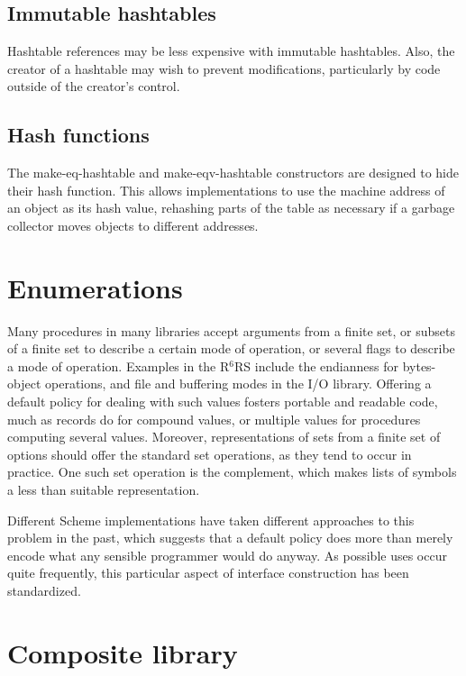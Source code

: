 \documentclass[twoside,twocolumn]{algol60}
\newcommand{\rn}[1]{R$^{#1}$RS}
\begin{document}
\section{Immutable hashtables}

Hashtable references may be less expensive with immutable hashtables.
Also, the creator of a hashtable may wish to prevent 
modifications, particularly by code outside of the creator's 
control.

\section{Hash functions}

The {\cf make-eq-hashtable} and {\cf make-eqv-hashtable} constructors
are designed to hide their hash function.  This allows implementations
to use the machine address of an object as its hash value, rehashing
parts of the table as necessary if a garbage collector moves
objects to different addresses.

\chapter{Enumerations}

Many procedures in many libraries accept arguments from a finite set,
or subsets of a finite set to describe a certain mode of operation,
or several flags to describe a mode of operation.  Examples in the
\rn{6} include the endianness for bytes-object operations, and file
and buffering modes in the I/O library.  Offering a default policy for
dealing with such values fosters portable and readable code, much as
records do for compound values, or multiple values for procedures
computing several values.  Moreover, representations of sets from a
finite set of options should offer the standard set operations, as
they tend to occur in practice.  One such set operation is the
complement, which makes lists of symbols a less than suitable
representation.

Different Scheme implementations have taken different approaches to
this problem in the past, which suggests that a default policy does
more than merely encode what any sensible programmer would do anyway.  As
possible uses occur quite frequently, this particular aspect of
interface construction has been standardized.


\chapter{Composite library}
\end{document}
